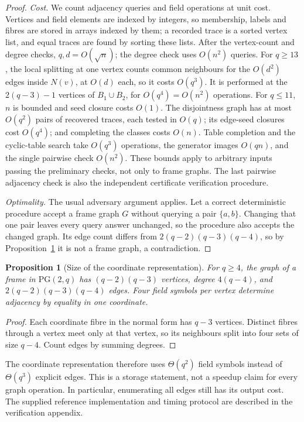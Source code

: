 \documentclass[11pt]{article}
\newtheorem{proposition}[theorem]{Proposition}
\theoremstyle{definition}
\theoremstyle{remark}
\newcommand{\PG}{\mathrm{PG}}
\begin{document}
\begin{proof}
\emph{Cost.}
We count adjacency queries and field operations at unit cost. Vertices
and field elements are indexed by integers, so membership, labels and
fibres are stored in arrays indexed by them; a recorded trace is a sorted
vertex list, and equal traces are found by sorting these lists. After
the vertex-count and degree checks, $q,d=O(\sqrt n)$; the degree
check uses $O(n^2)$ queries. For $q\ge13$, the local splitting at one
vertex counts common neighbours for the $O(d^2)$ edges inside $N(v)$, at
$O(d)$ each, so it costs $O(q^3)$. It is performed at the $2(q-3)-1$
vertices of $B_1\cup B_2$, for $O(q^4)=O(n^2)$ operations. For
$q\le11$, $n$ is bounded and seed closure costs $O(1)$. The disjointness graph has at most $O(q^2)$ pairs of
recovered traces, each tested in $O(q)$; its edge-seed closures cost
$O(q^4)$; and completing the classes costs $O(n)$. Table completion and
the cyclic-table search take $O(q^3)$ operations, the generator images
$O(qn)$, and the single pairwise check $O(n^2)$. These bounds apply to
arbitrary inputs passing the preliminary checks, not only to frame graphs.
The last pairwise adjacency check is also the independent certificate
verification procedure.

\emph{Optimality.}
The usual adversary argument applies. Let a correct deterministic procedure accept a frame graph $G$ without
querying a pair $\{a,b\}$. Changing that one pair leaves every query
answer unchanged, so the procedure also accepts the changed graph. Its
edge count differs from $2(q-2)(q-3)(q-4)$, so by
Proposition~\ref{prop:size} it is not a frame graph, a contradiction.
\end{proof}

\begin{proposition}[Size of the coordinate representation]\label{prop:size}
For $q\ge4$, the graph of a frame in $\PG(2,q)$ has $(q-2)(q-3)$
vertices, degree $4(q-4)$, and
$2(q-2)(q-3)(q-4)$ edges. Four field symbols per vertex determine
adjacency by equality in one coordinate.
\end{proposition}
\begin{proof}
Each coordinate fibre in the normal form has $q-3$ vertices. Distinct
fibres through a vertex meet only at that vertex, so its neighbours
split into four sets of size $q-4$. Count edges by summing degrees.
\end{proof}

The coordinate representation therefore uses $\Theta(q^2)$ field symbols
instead of $\Theta(q^3)$ explicit edges. This is a storage statement,
not a speedup claim for every graph operation. In particular, enumerating
all edges still has its output cost. The supplied reference implementation
and timing protocol are described in the verification appendix.
\end{document}
